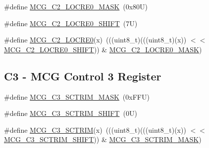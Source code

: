 \begin{DoxyCompactItemize}
\item 
\#define \mbox{\hyperlink{group___m_c_g___register___masks_gae89f2e48b02a39563115d1a60dc8f16f}{M\+C\+G\+\_\+\+C2\+\_\+\+L\+O\+C\+R\+E0\+\_\+\+M\+A\+SK}}~(0x80\+U)
\item 
\#define \mbox{\hyperlink{group___m_c_g___register___masks_gabc900505d9a12bd7a33c2a5e3cfdf02a}{M\+C\+G\+\_\+\+C2\+\_\+\+L\+O\+C\+R\+E0\+\_\+\+S\+H\+I\+FT}}~(7\+U)
\item 
\#define \mbox{\hyperlink{group___m_c_g___register___masks_ga3d3b107b5048c654be690911ae09feff}{M\+C\+G\+\_\+\+C2\+\_\+\+L\+O\+C\+R\+E0}}(x)~(((uint8\+\_\+t)(((uint8\+\_\+t)(x)) $<$$<$ \mbox{\hyperlink{group___m_c_g___register___masks_gabc900505d9a12bd7a33c2a5e3cfdf02a}{M\+C\+G\+\_\+\+C2\+\_\+\+L\+O\+C\+R\+E0\+\_\+\+S\+H\+I\+FT}})) \& \mbox{\hyperlink{group___m_c_g___register___masks_gae89f2e48b02a39563115d1a60dc8f16f}{M\+C\+G\+\_\+\+C2\+\_\+\+L\+O\+C\+R\+E0\+\_\+\+M\+A\+SK}})
\end{DoxyCompactItemize}
\subsection*{C3 -\/ M\+CG Control 3 Register}
\begin{DoxyCompactItemize}
\item 
\#define \mbox{\hyperlink{group___m_c_g___register___masks_ga44433c6372539508fbf3090b591f3d89}{M\+C\+G\+\_\+\+C3\+\_\+\+S\+C\+T\+R\+I\+M\+\_\+\+M\+A\+SK}}~(0x\+F\+F\+U)
\item 
\#define \mbox{\hyperlink{group___m_c_g___register___masks_ga8b5c3c55be188745fefec24b945110b7}{M\+C\+G\+\_\+\+C3\+\_\+\+S\+C\+T\+R\+I\+M\+\_\+\+S\+H\+I\+FT}}~(0\+U)
\item 
\#define \mbox{\hyperlink{group___m_c_g___register___masks_ga66a74a75c9244dad3298474a2bf04de8}{M\+C\+G\+\_\+\+C3\+\_\+\+S\+C\+T\+R\+IM}}(x)~(((uint8\+\_\+t)(((uint8\+\_\+t)(x)) $<$$<$ \mbox{\hyperlink{group___m_c_g___register___masks_ga8b5c3c55be188745fefec24b945110b7}{M\+C\+G\+\_\+\+C3\+\_\+\+S\+C\+T\+R\+I\+M\+\_\+\+S\+H\+I\+FT}})) \& \mbox{\hyperlink{group___m_c_g___register___masks_ga44433c6372539508fbf3090b591f3d89}{M\+C\+G\+\_\+\+C3\+\_\+\+S\+C\+T\+R\+I\+M\+\_\+\+M\+A\+SK}})
\end{DoxyCompactItemize}
